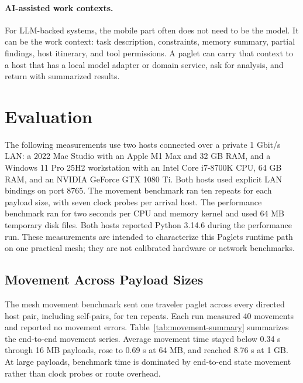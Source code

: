 \documentclass[11pt,a4paper]{article}
\begin{document}
\paragraph{AI-assisted work contexts.}
For LLM-backed systems, the mobile part often does not need to be the model. It
can be the work context: task description, constraints, memory summary, partial
findings, host itinerary, and tool permissions. A paglet can carry that context
to a host that has a local model adapter or domain service, ask for analysis,
and return with summarized results.

\section{Evaluation}

The following measurements use two hosts connected over a private 1 Gbit/s LAN:
a 2022 Mac Studio with an Apple M1 Max and 32 GB RAM, and a Windows 11 Pro 25H2
workstation with an Intel Core i7-8700K CPU, 64 GB RAM, and an NVIDIA GeForce
GTX 1080 Ti. Both hosts used explicit LAN bindings on port 8765. The movement
benchmark ran ten repeats for each payload size, with seven clock probes per
arrival host. The performance benchmark ran for two seconds per CPU and memory
kernel and used 64 MB temporary disk files. Both hosts reported Python 3.14.6
during the performance run. These measurements are intended to characterize
this Paglets runtime path on one practical mesh; they are not calibrated
hardware or network benchmarks.

\subsection{Movement Across Payload Sizes}

The mesh movement benchmark sent one traveler paglet across every directed host
pair, including self-pairs, for ten repeats. Each run measured 40 movements and
reported no movement errors. Table~\ref{tab:movement-summary} summarizes the
end-to-end movement series. Average movement time stayed below 0.34 s through
16 MB payloads, rose to 0.69 s at 64 MB, and reached 8.76 s at 1 GB. At large
payloads, benchmark time is dominated by end-to-end state movement rather than
clock probes or route overhead.
\end{document}
